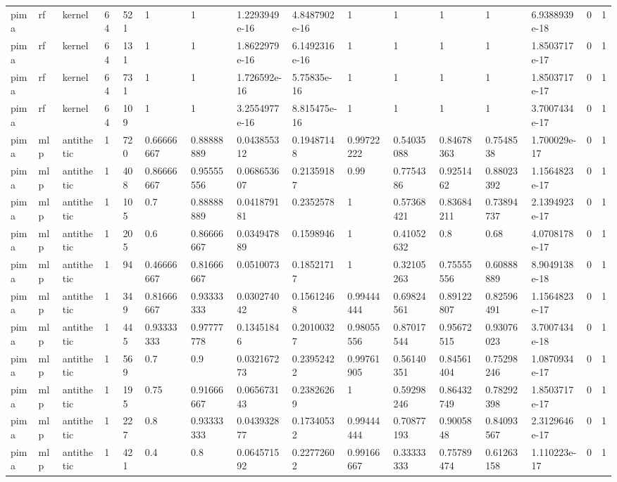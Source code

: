 \begin{tabular}{llllllllllllllll}
pima & rf & kernel & 64 & 521 & 1 & 1 & 1.2293949e-16 & 4.8487902e-16 & 1 & 1 & 1 & 1 & 6.9388939e-18 & 0 & 1 \\
pima & rf & kernel & 64 & 131 & 1 & 1 & 1.8622979e-16 & 6.1492316e-16 & 1 & 1 & 1 & 1 & 1.8503717e-17 & 0 & 1 \\
pima & rf & kernel & 64 & 731 & 1 & 1 & 1.726592e-16 & 5.75835e-16 & 1 & 1 & 1 & 1 & 1.8503717e-17 & 0 & 1 \\
pima & rf & kernel & 64 & 109 & 1 & 1 & 3.2554977e-16 & 8.815475e-16 & 1 & 1 & 1 & 1 & 3.7007434e-17 & 0 & 1 \\
pima & mlp & antithetic & 1 & 720 & 0.66666667 & 0.88888889 & 0.043855312 & 0.19487148 & 0.99722222 & 0.54035088 & 0.84678363 & 0.7548538 & 1.700029e-17 & 0 & 1 \\
pima & mlp & antithetic & 1 & 408 & 0.86666667 & 0.95555556 & 0.068653607 & 0.21359187 & 0.99 & 0.7754386 & 0.9251462 & 0.88023392 & 1.1564823e-17 & 0 & 1 \\
pima & mlp & antithetic & 1 & 105 & 0.7 & 0.88888889 & 0.041879181 & 0.2352578 & 1 & 0.57368421 & 0.83684211 & 0.73894737 & 2.1394923e-17 & 0 & 1 \\
pima & mlp & antithetic & 1 & 205 & 0.6 & 0.86666667 & 0.034947889 & 0.1598946 & 1 & 0.41052632 & 0.8 & 0.68 & 4.0708178e-17 & 0 & 1 \\
pima & mlp & antithetic & 1 & 94 & 0.46666667 & 0.81666667 & 0.0510073 & 0.18521717 & 1 & 0.32105263 & 0.75555556 & 0.60888889 & 8.9049138e-18 & 0 & 1 \\
pima & mlp & antithetic & 1 & 349 & 0.81666667 & 0.93333333 & 0.030274042 & 0.15612468 & 0.99444444 & 0.69824561 & 0.89122807 & 0.82596491 & 1.1564823e-17 & 0 & 1 \\
pima & mlp & antithetic & 1 & 445 & 0.93333333 & 0.97777778 & 0.13451846 & 0.20100327 & 0.98055556 & 0.87017544 & 0.95672515 & 0.93076023 & 3.7007434e-18 & 0 & 1 \\
pima & mlp & antithetic & 1 & 569 & 0.7 & 0.9 & 0.032167273 & 0.23952422 & 0.99761905 & 0.56140351 & 0.84561404 & 0.75298246 & 1.0870934e-17 & 0 & 1 \\
pima & mlp & antithetic & 1 & 195 & 0.75 & 0.91666667 & 0.065673143 & 0.23826269 & 1 & 0.59298246 & 0.86432749 & 0.78292398 & 1.8503717e-17 & 0 & 1 \\
pima & mlp & antithetic & 1 & 227 & 0.8 & 0.93333333 & 0.043932877 & 0.17340532 & 0.99444444 & 0.70877193 & 0.9005848 & 0.84093567 & 2.3129646e-17 & 0 & 1 \\
pima & mlp & antithetic & 1 & 421 & 0.4 & 0.8 & 0.064571592 & 0.22772602 & 0.99166667 & 0.33333333 & 0.75789474 & 0.61263158 & 1.110223e-17 & 0 & 1 \\

\end{tabular}

